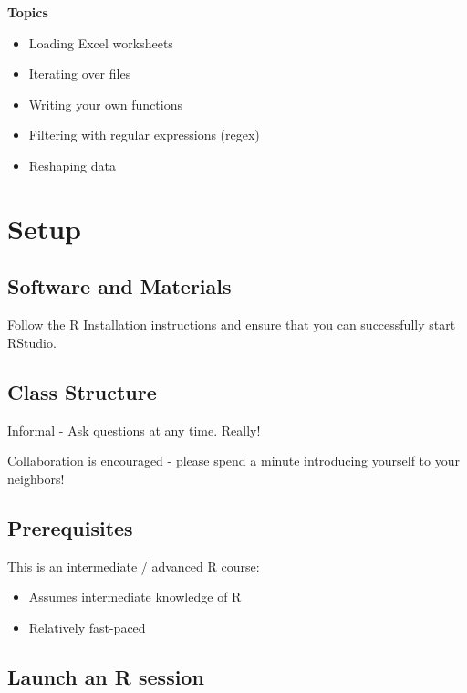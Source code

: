 \documentclass[]{book}
\providecommand{\tightlist}{%
  \setlength{\itemsep}{0pt}\setlength{\parskip}{0pt}}
\begin{document}
\textbf{Topics}

\begin{itemize}
\tightlist
\item
  Loading Excel worksheets
\item
  Iterating over files
\item
  Writing your own functions
\item
  Filtering with regular expressions (regex)
\item
  Reshaping data
\end{itemize}

\hypertarget{setup-3}{%
\section{Setup}\label{setup-3}}

\hypertarget{software-and-materials-3}{%
\subsection{Software and Materials}\label{software-and-materials-3}}

Follow the \href{./Rinstall.html}{R Installation} instructions and ensure that you can successfully start RStudio.

\hypertarget{class-structure-3}{%
\subsection{Class Structure}\label{class-structure-3}}

Informal - Ask questions at any time. Really!

Collaboration is encouraged - please spend a minute introducing yourself to your neighbors!

\hypertarget{prerequisites-3}{%
\subsection{Prerequisites}\label{prerequisites-3}}

This is an intermediate / advanced R course:

\begin{itemize}
\tightlist
\item
  Assumes intermediate knowledge of R
\item
  Relatively fast-paced
\end{itemize}

\hypertarget{launch-an-r-session-2}{%
\subsection{Launch an R session}\label{launch-an-r-session-2}}
\end{document}
